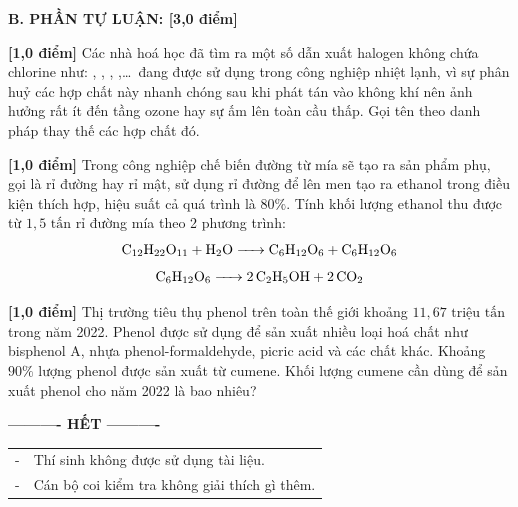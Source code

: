 \documentclass[12pt,a4paper]{article}
\begin{document}
\smallskip
\noindent
\textbf{B. PHẦN TỰ LUẬN: [3,0 điểm]}

\begin{flushleft}
	{\color{blue!50!green}}
\end{flushleft}
\setcounter{ex}{0}
\setcounter{bt}{0}

\begin{ex}
\textbf{[1,0 điểm]} Các nhà hoá học đã tìm ra một số dẫn xuất halogen không chứa chlorine như: , , , ,\dots\ đang được sử dụng trong công nghiệp nhiệt lạnh, vì sự phân huỷ các hợp chất này nhanh chóng sau khi phát tán vào không khí nên ảnh hưởng rất ít đến tầng ozone hay sự ấm lên toàn cầu thấp. Gọi tên theo danh pháp thay thế các hợp chất đó.
\loigiai{}
\end{ex}

\begin{ex}
\textbf{[1,0 điểm]} Trong công nghiệp chế biến đường từ mía sẽ tạo ra sản phẩm phụ, gọi là rỉ đường hay rỉ mật, sử dụng rỉ đường để lên men tạo ra ethanol trong điều kiện thích hợp, hiệu suất cả quá trình là $80\%$. Tính khối lượng ethanol thu được từ $1{,}5\text{ tấn}$ rỉ đường mía theo 2 phương trình:
$$\ce{C12H22O11 + H2O -> C6H12O6 + C6H12O6}$$
$$\ce{C6H12O6 -> 2C2H5OH + 2CO2}$$
\loigiai{}
\end{ex}

\begin{ex}
\textbf{[1,0 điểm]} Thị trường tiêu thụ phenol trên toàn thế giới khoảng $11{,}67\text{ triệu tấn}$ trong năm 2022. Phenol được sử dụng để sản xuất nhiều loại hoá chất như bisphenol A, nhựa phenol-formaldehyde, picric acid và các chất khác. Khoảng $90\%$ lượng phenol được sản xuất từ cumene. Khối lượng cumene cần dùng để sản xuất phenol cho năm 2022 là bao nhiêu?
\loigiai{}
\end{ex}

\begin{center}
\textbf{---------- HẾT ----------}
\end{center}

\smallskip
\noindent
\begin{tabular}{ll}
- & Thí sinh không được sử dụng tài liệu.\\
- & Cán bộ coi kiểm tra không giải thích gì thêm.
\end{tabular}
\end{document}
